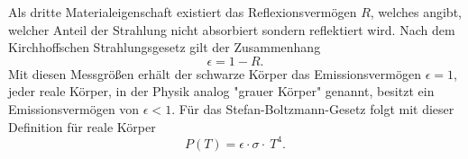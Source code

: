 Als dritte Materialeigenschaft existiert das Reflexionsvermögen $R$, welches angibt, welcher Anteil der Strahlung nicht absorbiert sondern reflektiert wird.
Nach dem Kirchhoffschen Strahlungsgesetz gilt der Zusammenhang
\begin{equation}
  \epsilon = 1-R.
\end{equation}
Mit diesen Messgrößen erhält der schwarze Körper das Emissionsvermögen $\epsilon = 1$, jeder reale Körper, in der Physik analog "grauer Körper" genannt, besitzt ein Emissionsvermögen von $\epsilon < 1$.
Für das Stefan-Boltzmann-Gesetz folgt mit dieser Definition für reale Körper
\begin{equation}
  P(T) = \epsilon \cdot \sigma \cdot \ T^4.
\end{equation}

\cite{sample}

